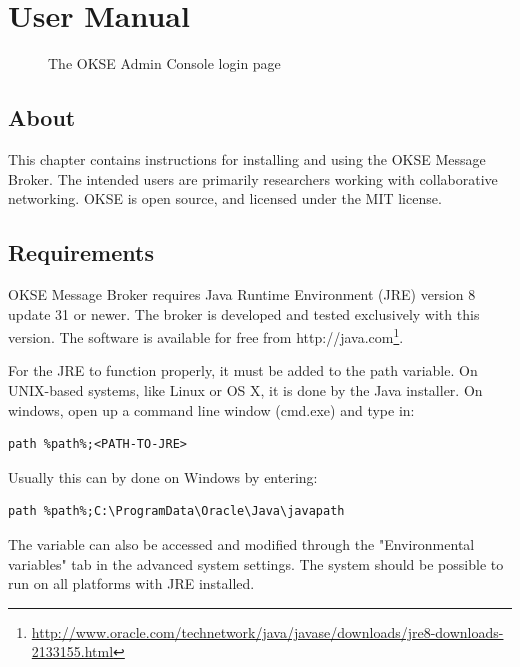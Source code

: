 \chapter{User Manual}
\label{appendix-user-manual}

\begin{center}
  \begin{figure}[ht!]
    \caption{The OKSE Admin Console login page} 
    \label{fig:OKSE Admin Console login page}
  \end{figure}
\end{center}

\section{About}

This chapter contains instructions for installing and using the OKSE Message Broker. The intended users are primarily researchers working with collaborative networking. OKSE is open source, and licensed under the MIT license.

\section{Requirements}

OKSE Message Broker requires Java Runtime Environment (JRE) version 8 update 31 or newer. The broker is developed and tested exclusively with this version. The software is available for free from http://java.com\footnote{\url{http://www.oracle.com/technetwork/java/javase/downloads/jre8-downloads-2133155.html}}.

For the JRE to function properly, it must be added to the path variable. On UNIX-based systems, like Linux or OS X, it is done by the Java installer. On windows, open up a command line window (cmd.exe) and type in:
\begin{verbatim}
path %path%;<PATH-TO-JRE>
\end{verbatim}
Usually this can by done on Windows by entering:
\begin{verbatim}
path %path%;C:\ProgramData\Oracle\Java\javapath
\end{verbatim}
The variable can also be accessed and modified through the "Environmental variables" tab in the advanced system settings. The system should be possible to run on all platforms with JRE installed. 

